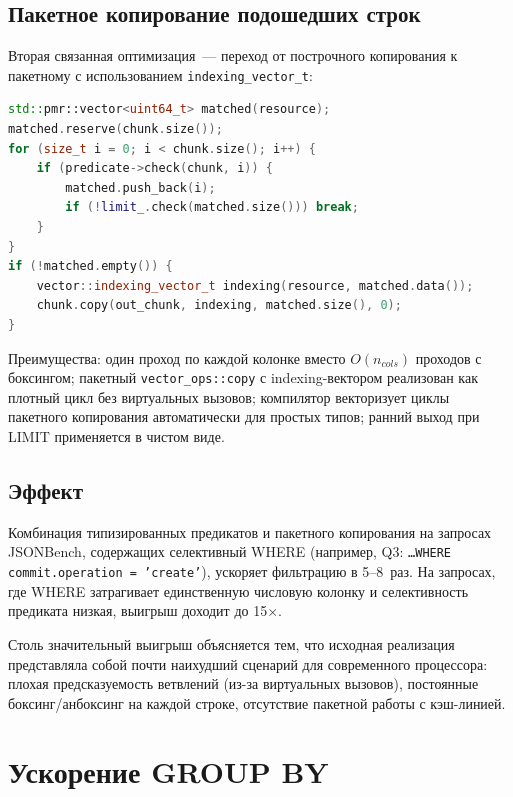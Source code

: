 \subsection{Пакетное копирование подошедших строк}

Вторая связанная оптимизация~--- переход от построчного копирования
к пакетному с использованием \texttt{indexing\_vector\_t}:

\begin{lstlisting}[language=C++,caption={Пакетное копирование через
                   indexing-вектор}, label={lst:batch-copy}]
std::pmr::vector<uint64_t> matched(resource);
matched.reserve(chunk.size());
for (size_t i = 0; i < chunk.size(); i++) {
    if (predicate->check(chunk, i)) {
        matched.push_back(i);
        if (!limit_.check(matched.size())) break;
    }
}
if (!matched.empty()) {
    vector::indexing_vector_t indexing(resource, matched.data());
    chunk.copy(out_chunk, indexing, matched.size(), 0);
}
\end{lstlisting}

Преимущества: один проход по каждой колонке вместо $O(n_\mathit{cols})$
проходов с боксингом; пакетный \texttt{vector\_ops::copy} с
indexing-вектором реализован как плотный цикл без виртуальных
вызовов; компилятор векторизует циклы пакетного копирования
автоматически для простых типов; ранний выход при LIMIT
применяется в чистом виде.

\subsection{Эффект}

Комбинация типизированных предикатов и пакетного копирования на
запросах JSONBench, содержащих селективный WHERE (например, Q3:
\texttt{\ldots WHERE commit.operation = 'create'}), ускоряет
фильтрацию в 5--8~раз. На запросах, где WHERE затрагивает
единственную числовую колонку и селективность предиката низкая,
выигрыш доходит до 15$\times$.

Столь значительный выигрыш объясняется тем, что исходная
реализация представляла собой почти наихудший сценарий для
современного процессора: плохая предсказуемость ветвлений (из-за
виртуальных вызовов), постоянные боксинг/анбоксинг на каждой
строке, отсутствие пакетной работы с кэш-линией.

\section{Ускорение GROUP BY}

